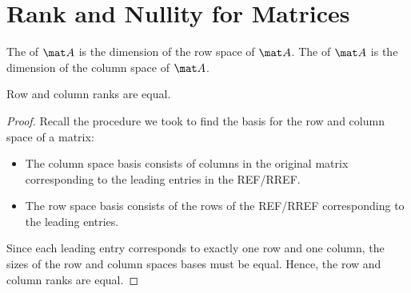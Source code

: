 
\section{Rank and Nullity for Matrices}

\begin{definition}
    The  of $\mat A$ is the dimension of the row space of $\mat A$. The  of $\mat A$ is the dimension of the column space of $\mat A$.
\end{definition}

\begin{proposition}
    Row and column ranks are equal.
\end{proposition}
\begin{proof}
    Recall the procedure we took to find the basis for the row and column space of a matrix:
    \begin{itemize}
        \item The column space basis consists of columns in the original matrix corresponding to the leading entries in the REF/RREF.
        \item The row space basis consists of the rows of the REF/RREF corresponding to the leading entries.
    \end{itemize}
    Since each leading entry corresponds to exactly one row and one column, the sizes of the row and column spaces bases must be equal. Hence, the row and column ranks are equal.
\end{proof}

